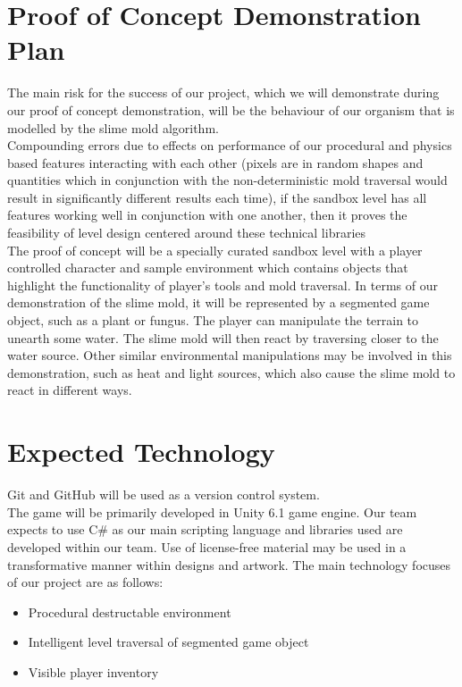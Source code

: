 \documentclass{article}
\begin{document}
\section{Proof of Concept Demonstration Plan}

The main risk for the success of our project, which we will demonstrate during our proof of concept demonstration, will be the behaviour of our organism that is modelled by the slime mold algorithm.\\

Compounding errors due to effects on performance of our procedural and physics based features interacting with each other (pixels are in random shapes and quantities which in conjunction with the non-deterministic mold traversal would result in significantly different results each time), if the sandbox level has all features working well in conjunction with one another, then it proves the feasibility of level design centered around these technical libraries\\

The proof of concept will be a specially curated sandbox level with a player controlled character and sample environment which contains objects that highlight the functionality of player’s tools and mold traversal. In terms of our demonstration of the slime mold, it will be represented by a segmented game object, such as a plant or fungus. The player can manipulate the terrain to unearth some water. The slime mold will then react by traversing closer to the water source. Other similar environmental manipulations may be involved in this demonstration, such as heat and light sources, which also cause the slime mold to react in different ways.\\


\section{Expected Technology}

Git and GitHub will be used as a version control system.\\

The game will be primarily developed in Unity 6.1 game engine. Our team expects to use C\# as our main scripting language and libraries used are developed within our team. Use of license-free material may be used in a transformative manner within designs and artwork. The main technology focuses of our project are as follows:
\begin{itemize}
\item{Procedural destructable environment}
\item{Intelligent level traversal of segmented game object}
\item{Visible player inventory}
\end{itemize}
\end{document}
